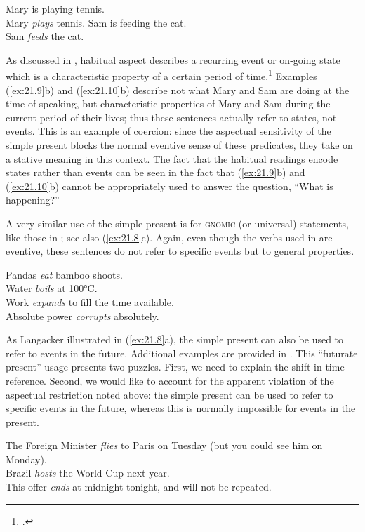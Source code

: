 \ea \label{ex:21.9}
\ea  Mary is playing tennis.\\
\ex Mary \textit{plays} tennis.
                       \z
\ex \label{ex:21.10}
\ea  Sam is feeding the cat.\\
\ex Sam \textit{feeds} the cat.
                       \z
\z

As discussed in , habitual aspect describes a recurring event or on-going state which is a characteristic property of a certain period of time.\footnote{\citet[27--28]{Comrie1976}.} Examples (\ref{ex:21.9}b) and (\ref{ex:21.10}b) describe not what Mary and Sam are doing at the time of speaking, but characteristic properties of Mary and Sam during the current period of their lives; thus these sentences actually refer to states, not events. This is an example of coercion: since the aspectual sensitivity of the simple present blocks the normal eventive sense of these predicates, they take on a stative meaning in this context. The fact that the habitual readings encode states rather than events can be seen in the fact that (\ref{ex:21.9}b) and (\ref{ex:21.10}b) cannot be appropriately used to answer the question, “What is happening?”


A very similar use of the simple present is for \textsc{gnomic} (or universal) statements, like those in ; see also (\ref{ex:21.8}c). Again, even though the verbs used in  are eventive, these sentences do not refer to specific events but to general properties.


\ea \label{ex:21.11}
\ea  Pandas \textit{eat} bamboo shoots.\\
\ex Water \textit{boils} at 100°C.\\
\ex Work \textit{expands} to fill the time available.\\
\ex Absolute power \textit{corrupts} absolutely.
                       \z
\z

As Langacker illustrated in (\ref{ex:21.8}a), the simple present can also be used to refer to events in the future. Additional examples are provided in . This “futurate present” usage presents two puzzles. First, we need to explain the shift in time reference. Second, we would like to account for the apparent violation of the aspectual restriction noted above: the simple present can be used to refer to specific events in the future, whereas this is normally impossible for events in the present.

\ea \label{ex:21.12}
\ea  The Foreign Minister \textit{flies} to Paris on Tuesday (but you could see him on Monday).\\
\ex Brazil \textit{hosts} the World Cup next year.\\
\ex This offer \textit{ends} at midnight tonight, and will not be repeated.
                       \z
\z

